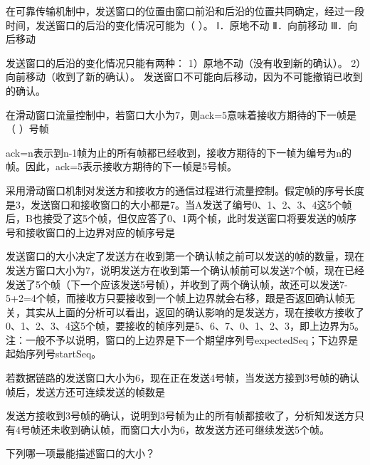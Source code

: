 \question 在可靠传输机制中，发送窗口的位置由窗口前沿和后沿的位置共同确定，经过一段时间，发送窗口的后沿的变化情况可能为（
）。 Ⅰ．原地不动 Ⅱ．向前移动 Ⅲ．向后移动
\par{}
\begin{solution}发送窗口的后沿的变化情况只能有两种： 1）原地不动（没有收到新的确认）。
2）向前移动（收到了新的确认）。
发送窗口不可能向后移动，因为不可能撤销已收到的确认。
\end{solution}
\question 在滑动窗口流量控制中，若窗口大小为7，则ack=5意味着接收方期待的下一帧是（
）号帧
\par{}
\begin{solution}ack=n表示到n-1帧为止的所有帧都已经收到，接收方期待的下一帧为编号为n的帧。因此，ack=5表示接收方期待的下一帧是5号帧。
\end{solution}
\question 采用滑动窗口机制对发送方和接收方的通信过程进行流量控制。假定帧的序号长度是3，发送窗口和接收窗口的大小都是7。当A发送了编号0、1、2、3、4这5个帧后，B也接受了这5个帧，但仅应答了0、1两个帧，此时发送窗口将要发送的帧序号和接收窗口的上边界对应的帧序号是
\par{}
\begin{solution}发送窗口的大小决定了发送方在收到第一个确认帧之前可以发送的帧的数量，现在发送方窗口大小为7，说明发送方在收到第一个确认帧前可以发送7个帧，现在已经发送了5个帧（下一个应该发送5号帧），并收到了两个确认帧，故还可以发送7-5+2=4个帧，而接收方只要接收到一个帧上边界就会右移，跟是否返回确认帧无关，其实从上面的分析可以看出，返回的确认影响的是发送方，现在接收方接收了0、1、2、3、4这5个帧，要接收的帧序列是5、6、7、0、1、2、3，即上边界为5。
注：一般不予以说明，窗口的上边界是下一个期望序列号expectedSeq；下边界是起始序列号startSeq。
\end{solution}
\question 若数据链路的发送窗口大小为6，现在正在发送4号帧，当发送方接到3号帧的确认帧后，发送方还可连续发送的帧数是
\par{}
\begin{solution}发送方接收到3号帧的确认，说明到3号帧为止的所有帧都接收了，分析知发送方只有4号帧还未收到确认帧，而窗口大小为6，故发送方还可继续发送5个帧。
\end{solution}
\question 下列哪一项最能描述窗口的大小？
\par{}
